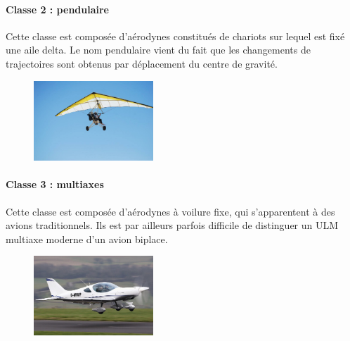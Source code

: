 	\paragraph{Classe 2 : pendulaire}
	Cette classe est composée d'aérodynes constitués de chariots sur lequel est fixé une aile delta. Le nom pendulaire vient du fait que les changements de trajectoires sont obtenus par déplacement du centre de gravité.	
	
	\begin{figure}[H]
  	\centering
    \includegraphics[width=0.4\textwidth]{01-EtudeAeronefs/img/ULM_Classe_2.jpg}
	\end{figure}	

	\paragraph{Classe 3 : multiaxes}
	Cette classe est composée d'aérodynes à voilure fixe, qui s'apparentent à des avions traditionnels. Ils est par ailleurs parfois difficile de distinguer un ULM  multiaxe moderne d'un avion biplace.
	
	
	\begin{figure}[H]
  	\centering
    \includegraphics[width=0.4\textwidth]{01-EtudeAeronefs/img/ULM_Classe_3.jpg}
	\end{figure}	

